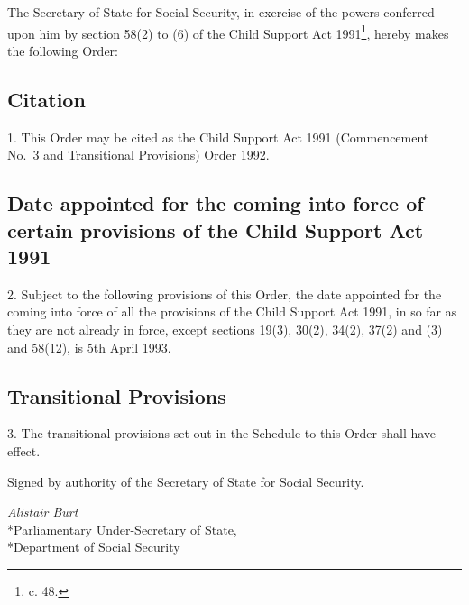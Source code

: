 \documentclass[12pt,a4paper]{article}
\title{\regstitle}
\author{S.I. 1992 No. 2644 (C.83)}
\date{Made 26th October 1992}
\begin{document}
\maketitle

\noindent
The Secretary of State for Social Security, in exercise of the powers conferred upon him by section 58(2) to (6) of the Child Support Act 1991\footnote{ c. 48.}, hereby makes the following Order:

{\sloppy

\tableofcontents

}

\setcounter{secnumdepth}{-2}

\subsection[1. Citation]{Citation}

1.  This Order may be cited as the Child Support Act 1991 (Commencement No.\ 3 and Transitional Provisions) Order 1992.

\subsection[2. Date appointed for the coming into force of certain provisions of the Child Support Act 1991]{Date appointed for the coming into force of certain provisions of the Child Support Act 1991}

2.  Subject to the following provisions of this Order, the date appointed for the coming into force of all the provisions of the Child Support Act 1991, in so far as they are not already in force, except sections 19(3), 30(2), 34(2), 37(2) and (3) and 58(12), is 5th April 1993.

\subsection[3. Transitional Provisions]{Transitional Provisions}

3.  The transitional provisions set out in the Schedule to this Order shall have effect.

\bigskip

Signed by authority of the Secretary of State for Social Security.

{\raggedleft
\emph{Alistair Burt}\\*Parliamentary Under-Secretary of State,\\*Department of Social Security

}
\end{document}
